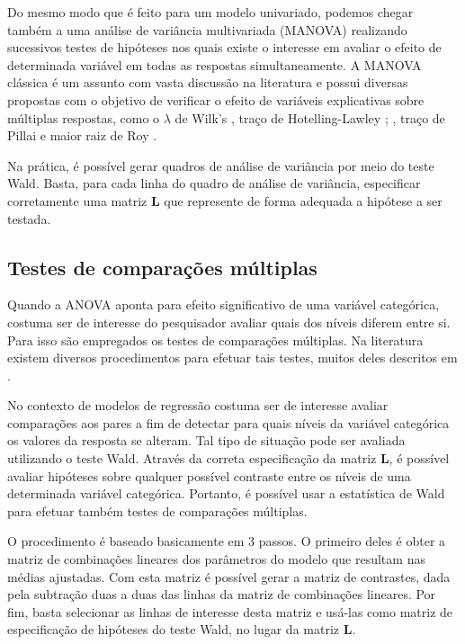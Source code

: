 Do mesmo modo que é feito para um modelo univariado, podemos chegar também a uma análise de variância multivariada (MANOVA) realizando sucessivos testes de hipóteses nos quais existe o interesse em avaliar o efeito de determinada variável em todas as respostas simultaneamente. A MANOVA clássica \citep{manova} é um assunto com vasta discussão na literatura e possui diversas propostas com o objetivo de verificar o efeito de variáveis explicativas sobre múltiplas respostas, como o $\lambda$ de Wilk's \citep{wilks}, traço de Hotelling-Lawley \citep{lawley}; \citep{hotelling}, traço de Pillai \citep{pillai} e maior raiz de Roy \citep{roy}. 

Na prática, é possível gerar quadros de análise de variância por meio do teste Wald. Basta, para cada linha do quadro de análise de variância, especificar corretamente uma matriz $\boldsymbol{L}$ que represente de forma adequada a hipótese a ser testada.

\subsection{Testes de comparações múltiplas}\label{sec:multcomp}

Quando a ANOVA aponta para efeito significativo de uma variável categórica, costuma ser de interesse do pesquisador avaliar quais dos níveis diferem entre si. Para isso são empregados os testes de comparações múltiplas. Na literatura existem diversos procedimentos para efetuar tais testes, muitos deles descritos em \citet{hsu1996multiple}.

No contexto de modelos de regressão costuma ser de interesse avaliar comparações aos pares a fim de detectar para quais níveis da variável categórica os valores da resposta se alteram. Tal tipo de situação pode ser avaliada utilizando o teste Wald. Através da correta especificação da matriz $\boldsymbol{L}$, é possível avaliar hipóteses sobre qualquer possível contraste entre os níveis de uma determinada variável categórica. Portanto, é possível usar a estatística de Wald para efetuar também testes de comparações múltiplas.

O procedimento é baseado basicamente em 3 passos. O primeiro deles é obter a matriz de combinações lineares dos parâmetros do modelo que resultam nas médias ajustadas. Com esta matriz é possível gerar a matriz de contrastes, dada pela subtração duas a duas das linhas da matriz de combinações lineares. Por fim, basta selecionar as linhas de interesse desta matriz e usá-las como matriz de especificação de hipóteses do teste Wald, no lugar da matriz $\boldsymbol{L}$.
	
